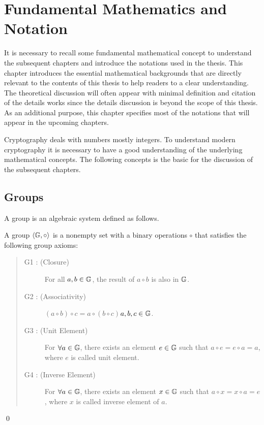 
\chapter{Fundamental Mathematics and Notation}
It is necessary to recall some fundamental mathematical concept to understand the subsequent chapters and introduce the notations used in the thesis.
This chapter introduces the essential mathematical backgrounds that are directly relevant to the contents of this thesis to help readers to a clear understanding.
The theoretical discussion will often appear with minimal definition and citation of the details works since the details discussion is beyond the scope of this thesis.
As an additional purpose, this chapter specifies most of the notations that will appear in the upcoming chapters.
\label{Ch_fundamentals} %

Cryptography deals with numbers mostly integers.
To understand modern cryptography  it is necessary to have a good understanding of the  underlying mathematical concepts. 
The following concepts is the basic for the discussion of the subsequent chapters.


\section{Groups}\label{group}

A group  is an algebraic system defined as follows.
\begin{definition}
A group $\langle\mathbb{G}\index{group},\circ\rangle$ is a nonempty set with a binary operations $\circ$ that satisfies the following group axioms:
\begin{quote}\begin{description}
\item[G1 : (Closure)] For all $a, b \in\mathbb{G}\index{group}$, the result of $a\circ b$ is also in $\mathbb{G}\index{group}$.
\item[G2 : (Associativity)] $(a\circ b)\circ c=a\circ (b\circ c)$\hspace{2em}$a,b,c\in\mathbb{G}\index{group}$.
\item[G3 : (Unit Element)] For $\forall a \in\mathbb{G}\index{group}$, there exists an element $e\in\mathbb{G}\index{group}$ such that $a\circ e=e\circ a=a$, where $e$ is called unit element.
\item[G4 : (Inverse Element)] For ${\forall}a \in\mathbb{G}\index{group}$, there exists an element $x\in\mathbb{G}\index{group}$ such that $a\circ x=x\circ a=e$, where $x$ is called inverse element of $a$.
\end{description}\end{quote}
\qed
\end{definition}

